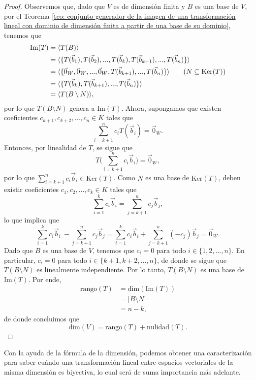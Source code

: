 \documentclass[apuntes]{subfiles}
\begin{document}
\begin{proof}
    Observemos que, dado que $V$ es de dimensión finita y $B$ es una base de $V$, por el Teorema \ref{teo: conjunto generador de la imagen de una transformación lineal con dominio de dimensión finita a partir de una base de su dominio}, tenemos que
    \begin{align*}
        \text{Im}(T) &= \langle T(B) \rangle \\
                     &= \langle \{T(\vec{b}_1),T(\vec{b}_2), ...,T(\vec{b}_k), T(\vec{b}_{k+1}), ..., T(\vec{b}_n)\} \rangle \\
                     &= \langle \{\vec{0}_W,\vec{0}_W, ...,\vec{0}_W, T(\vec{b}_{k+1}), ..., T(\vec{b}_n)\} \rangle \tag{$N\subseteq \text{Ker}(T)$} \\
                     &= \langle \{T(\vec{b}_k), T(\vec{b}_{k+1}), ..., T(\vec{b}_n)\} \rangle \\
                     &= \langle T(B\setminus N) \rangle,
    \end{align*}
    por lo que $T(B\setminus N)$ genera a $\text{Im}(T)$. Ahora, supongamos que existen coeficientes $c_{k+1},c_{k+2},...,c_n\in K$ tales que 
    \[
        \sum_{i=k+1}^n c_i T(\vec{b}_i) = \vec{0}_W.
    \] 
    Entonces, por linealidad de $T$, se sigue que
    \[
        T \bigg( \sum_{i=k+1}^n c_i \vec{b}_i \bigg) = \vec{0}_W,
    \] 
    por lo que $\sum_{i=k+1}^n c_i \vec{b}_i \in \text{Ker}(T)$. Como $N$ es una base de $\text{Ker}(T)$, deben existir coeficientes $c_1,c_2,...,c_k\in K$ tales que
    \[
        \sum_{i=1}^k c_i \vec{b}_i = \sum_{j=k+1}^n c_j \vec{b}_j,
    \] 
    lo que implica que
    \[
        \sum_{i=1}^k c_i \vec{b}_i \ - \sum_{j=k+1}^n c_j \vec{b}_j = \sum_{i=1}^k c_i \vec{b}_i + \sum_{j=k+1}^n (-c_j) \vec{b}_j = \vec{0}_W.
    \] 
    Dado que $B$ es una base de $V$, tenemos que $c_i=0$ para todo $i\in\{1,2,...,n\}$. En particular, $c_i=0$ para todo $i\in\{k+1,k+2,...,n\}$, de donde se sigue que $T(B\setminus N)$ es linealmente independiente. Por lo tanto, $T(B\setminus N)$ es una base de $\text{Im}(T)$. Por ende,
    \begin{align*}
        \text{rango}(T) &= \text{dim}(\text{Im}(T)) \\
                        &= |B\setminus N| \\
                        &= n-k,
    \end{align*}
    de donde concluimos que
    \[
        \text{dim}(V) = \text{rango}(T) + \text{nulidad}(T).
    \] 
\end{proof}

Con la ayuda de la fórmula de la dimensión, podemos obtener una caracterización para saber cuándo una transformación lineal entre espacios vectoriales de la misma dimensión es biyectiva, lo cual será de suma importancia más adelante.
\end{document}
